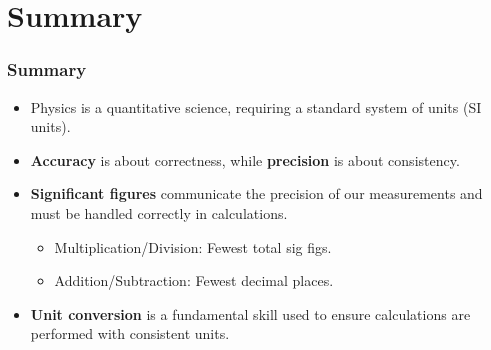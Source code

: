 \documentclass{beamer}
\begin{document}
\section{Summary}
\begin{frame}
    \frametitle{Summary}
    \begin{itemize}
        \item Physics is a quantitative science, requiring a standard system of units (SI units).
        \pause
        \medskip
        \item \textbf{Accuracy} is about correctness, while \textbf{precision} is about consistency.
        \pause
        \medskip
        \item \textbf{Significant figures} communicate the precision of our measurements and must be handled correctly in calculations.
        \pause
        \begin{itemize}
            \item Multiplication/Division: Fewest total sig figs.
            \pause
            \item Addition/Subtraction: Fewest decimal places.
        \end{itemize}
        \pause
        \medskip
        \item \textbf{Unit conversion} is a fundamental skill used to ensure calculations are performed with consistent units.
    \end{itemize}
\end{frame}
\end{document}
